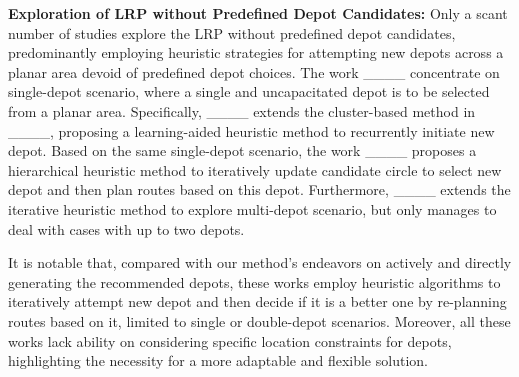 \textbf{Exploration of LRP without Predefined Depot Candidates:}
Only a scant number of studies explore the LRP without predefined depot candidates, 
predominantly employing heuristic strategies for attempting new depots across a planar area devoid of predefined depot choices. 
The work ____ concentrate on single-depot scenario, where a single and uncapacitated depot is to be selected from a planar area. 
Specifically, ____ extends the cluster-based method in ____, proposing a learning-aided heuristic method to recurrently initiate new depot. 
Based on the same single-depot scenario, the work ____ proposes a hierarchical heuristic method to iteratively update candidate circle to select new depot and then plan routes based on this depot.
Furthermore, ____ extends the iterative heuristic method to explore multi-depot scenario, but only manages to deal with cases with up to two depots. 

It is notable that, compared with our method's endeavors on actively and directly generating the recommended depots, 
these works employ heuristic algorithms to iteratively attempt new depot and then decide if it is a better one by re-planning routes based on it, 
limited to single or double-depot scenarios.
Moreover, all these works lack ability on considering specific location constraints for depots, 
highlighting the necessity for a more adaptable and flexible solution.


